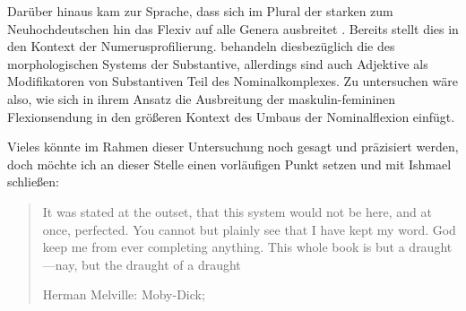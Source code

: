 Darüber hinaus kam zur Sprache, dass sich im Plural der starken
 zum Neuhochdeutschen hin das
Flexiv  auf alle Genera ausbreitet
\autocite[vgl.][191--192]{reichmannwegera1993}. Bereits \citet{askedal1973}
stellt dies in den Kontext der Numerusprofilierung. \citet{dammelgillmann2014}
behandeln diesbezüglich die  des morphologischen Systems der
Substantive, allerdings sind auch Adjektive als
Modifikatoren von Substantiven Teil des Nominalkomplexes. Zu untersuchen wäre
also, wie sich in ihrem Ansatz die Ausbreitung der maskulin-femininen
Flexionsendung in den größeren Kontext des Umbaus der Nominal\-flexion einfügt.


Vieles könnte im Rahmen dieser Untersuchung noch gesagt und präzisiert werden,
doch möchte ich an dieser Stelle einen vorläufigen Punkt setzen und mit Ishmael
schließen: \foreignblockquote{english}[{Herman Melville: Moby-Dick;
\cite[159]{melville:mobydick}}]{It was stated at the outset, that this system
would not be here, and at once, perfected. You cannot but plainly see that I
have kept my word.
\textelp{}
God keep me from ever completing anything. This whole book is but a
draught---nay, but the draught of a draught}. %
